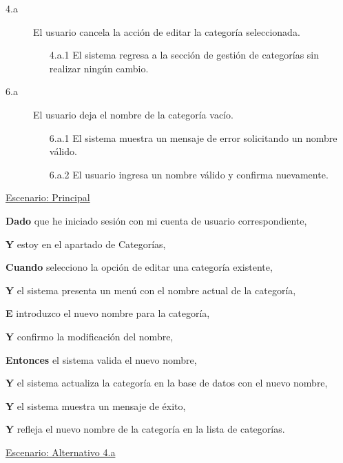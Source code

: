 \begin{description}
    \item[4.a] El usuario cancela la acción de editar la categoría seleccionada.
    \begin{enumerate}
        \item[4.a.1] El sistema regresa a la sección de gestión de categorías sin realizar ningún cambio.
    \end{enumerate}

    \item[6.a] El usuario deja el nombre de la categoría vacío.
    \begin{enumerate}
        \item[6.a.1] El sistema muestra un mensaje de error solicitando un nombre válido.
        \item[6.a.2] El usuario ingresa un nombre válido y confirma nuevamente.
    \end{enumerate}
\end{description}

\underline{Escenario: Principal}\par
\vspace{0.15cm}

\textbf{Dado} que he iniciado sesión con mi cuenta de usuario correspondiente,\par
\textbf{Y} estoy en el apartado de Categorías,\par
\textbf{Cuando} selecciono la opción de editar una categoría existente,\par
\textbf{Y} el sistema presenta un menú con el nombre actual de la categoría,\par
\textbf{E} introduzco el nuevo nombre para la categoría,\par
\textbf{Y} confirmo la modificación del nombre,\par
\textbf{Entonces} el sistema valida el nuevo nombre,\par
\textbf{Y} el sistema actualiza la categoría en la base de datos con el nuevo nombre,\par
\textbf{Y} el sistema muestra un mensaje de éxito,\par
\textbf{Y} refleja el nuevo nombre de la categoría en la lista de categorías.\par

\vspace{0.20cm}

\underline{Escenario: Alternativo 4.a}\par
\vspace{0.15cm}

